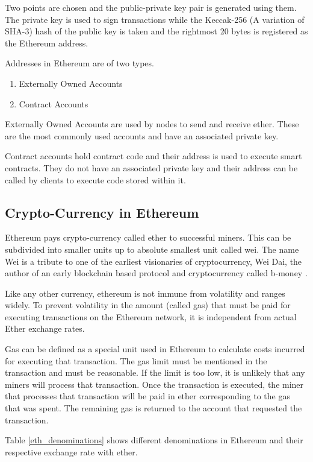 \documentclass[11pt,openright]{report}
\begin{document}
Two points are chosen and the public-private key pair is generated using them. The private key is used to sign transactions while the Keccak-256 (A variation of SHA-3) hash of the public key is taken and the rightmost 20 bytes is registered as the Ethereum address.

Addresses in Ethereum are of two types.
\begin{enumerate}
    \item Externally Owned Accounts
    \item Contract Accounts
\end{enumerate}

Externally Owned Accounts are used by nodes to send and receive ether. These are the most commonly used accounts and have an associated private key.

Contract accounts hold contract code and their address is used to execute smart contracts. They do not have an associated private key and their address can be called by clients to execute code stored within it.

\subsection{Crypto-Currency in Ethereum}
Ethereum pays crypto-currency called ether to successful miners. This can be subdivided into smaller units up to absolute smallest unit called wei. The name Wei is a tribute to one of the earliest visionaries of cryptocurrency, Wei Dai, the author of an early blockchain based protocol and cryptocurrency called b-money \cite{dai1998bmoney}.

Like any other currency, ethereum is not immune from volatility and ranges widely. To prevent volatility in the amount (called gas) that must be paid for executing transactions on the Ethereum network, it is independent from actual Ether exchange rates. 

Gas can be defined as a special unit used in Ethereum to calculate costs incurred for executing that transaction. The gas limit must be mentioned in the transaction and must be reasonable. If the limit is too low, it is unlikely that any miners will process that transaction. Once the transaction is executed, the miner that processes that transaction will be paid in ether corresponding to the gas that was spent. The remaining gas is returned to the account that requested the transaction.

Table \ref{eth_denominations} shows different denominations in Ethereum and their respective exchange rate with ether.
\end{document}
